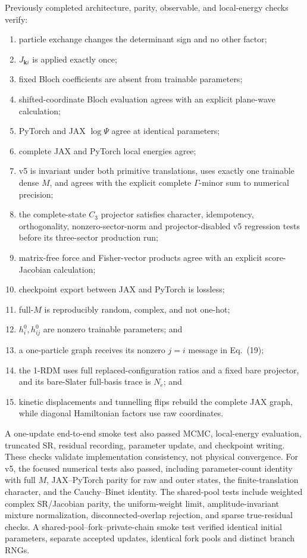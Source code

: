 Previously completed architecture, parity, observable, and local-energy checks verify:
\begin{enumerate}
 \item particle exchange changes the determinant sign and no other factor;
 \item $J_{\bm k i}$ is applied exactly once;
 \item fixed Bloch coefficients are absent from trainable parameters;
 \item shifted-coordinate Bloch evaluation agrees with an explicit
 plane-wave calculation;
 \item PyTorch and JAX $\log\Psi$ agree at identical parameters;
 \item complete JAX and PyTorch local energies agree;
 \item v5 is invariant under both primitive translations, uses exactly one
 trainable dense $M$, and agrees with the explicit complete $\Gamma$-minor
 sum to numerical precision;
 \item the complete-state $C_3$ projector satisfies character, idempotency,
 orthogonality, nonzero-sector-norm and projector-disabled v5 regression
 tests before its three-sector production run;
 \item matrix-free force and Fisher-vector products agree with an explicit
 score-Jacobian calculation;
 \item checkpoint export between JAX and PyTorch is lossless;
 \item full-$M$ is reproducibly random, complex, and not one-hot;
 \item $h_i^0,h_{ij}^0$ are nonzero trainable parameters; and
 \item a one-particle graph receives its nonzero $j=i$ message in Eq.~(19);
 \item the 1-RDM uses full replaced-configuration ratios and a fixed bare
 projector, and its bare-Slater full-basis trace is $N_e$; and
 \item kinetic displacements and tunnelling flips rebuild the complete JAX
 graph, while diagonal Hamiltonian factors use raw coordinates.
\end{enumerate}
A one-update end-to-end smoke test also passed MCMC, local-energy evaluation,
truncated SR, residual recording, parameter update, and checkpoint writing.
These checks validate implementation consistency, not physical convergence.
For v5, the focused numerical tests also passed, including parameter-count
identity with full $M$, JAX--PyTorch parity for raw and outer states, the
finite-translation character, and the Cauchy--Binet identity. The shared-pool
tests include weighted complex
SR/Jacobian parity, the uniform-weight limit, amplitude-invariant mixture
normalization, disconnected-overlap rejection, and sparse true-residual checks.
A shared-pool--fork--private-chain smoke test verified identical initial
parameters, separate accepted updates, identical fork pools and distinct branch RNGs.

